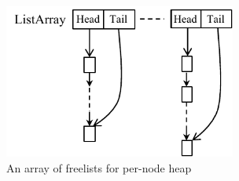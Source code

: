 
\begin{figure}[!ht]
\centering
\includegraphics[width=3in]{figure/listarray}
\caption{An array of freelists for per-node heap\label{fig:listarray}}
\end{figure}

